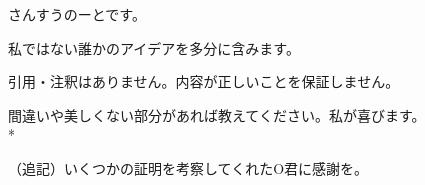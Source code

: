 
さんすうのーとです。

私ではない誰かのアイデアを多分に含みます。

引用・注釈はありません。内容が正しいことを保証しません。

間違いや美しくない部分があれば教えてください。私が喜びます。\\*

（追記）いくつかの証明を考察してくれたO君に感謝を。
